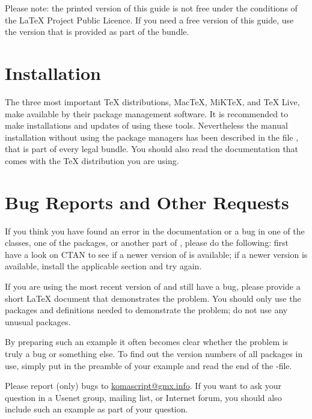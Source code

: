 %
{Please note: the printed version of this guide is not free under the
conditions of the {\LaTeX} Project Public Licence. If you need a free version
of this guide, use the version that is provided as part of the {\KOMAScript}
bundle.}


\section{Installation}
\label{sec:introduction.installation}

The three most important \TeX{} distributions, Mac\TeX, MiK\TeX, and \TeX{}
Live, make \KOMAScript{} available by their package management software. It is
recommended to make installations and updates of \KOMAScript{} using these
tools. Nevertheless the manual installation without using the package managers
has been described in the file , that is part of every legal
\KOMAScript{} bundle. You should also read the documentation that comes with
the {\TeX} distribution you are using.


\section{Bug Reports and Other Requests}
\label{sec:introduction.errors}

If you think you have found an error in the documentation or a bug in one of
the {\KOMAScript} classes, one of the {\KOMAScript} packages, or another part
of {\KOMAScript}, please do the following: first have a look on CTAN to see if
a newer version of {\KOMAScript} is available; if a newer version is
available, %
install the
applicable section and try again.

If you are using the most recent version of {\KOMAScript} and still have a
bug, please provide a short {\LaTeX} document that demonstrates the
problem. You should only use the packages and definitions needed to
demonstrate the problem; do not use any unusual packages.

By preparing such an example it often becomes clear whether the problem is
truly a {\KOMAScript} bug or something else.  To find out the version numbers
of all packages in use, simply put  in the preamble of your
example and read the end of the -file.

Please report {\KOMAScript} (only) bugs to
\href{mailto:komascript@gmx.info}{komascript@gmx.info}. If you want to ask
your question in a Usenet group, mailing list, or Internet forum, you should
also include such an example as part of your question.


